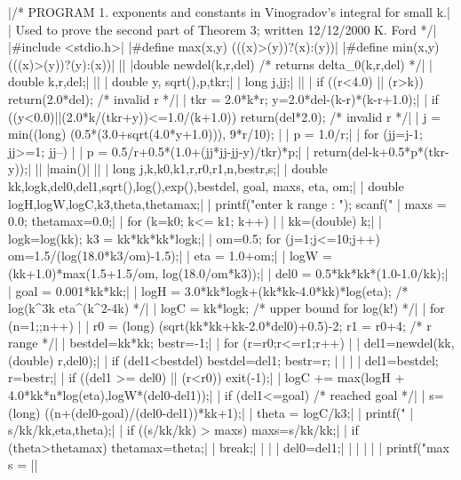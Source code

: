{

\eightpoint
\baselineskip 9pt
\beginlines
|/* PROGRAM 1. exponents and constants in Vinogradov's integral for small k.|
|   Used to prove the second part of Theorem 3; written 12/12/2000 K. Ford  */|
|#include <stdio.h>|
|#define max(x,y) (((x)>(y))?(x):(y))|
|#define min(x,y) (((x)>(y))?(y):(x))|
||
|double newdel(k,r,del)       /* returns delta_0(k,r,del) */|
|     double k,r,del;|
|{|
|  double y, sqrt(),p,tkr;|
|  long j,jj;|
||
|  if ((r<4.0) || (r>k)) return(2.0*del);  /* invalid r */|
|  tkr = 2.0*k*r; y=2.0*del-(k-r)*(k-r+1.0);|
|  if ((y<0.0)||(2.0*k/(tkr+y))<=1.0/(k+1.0)) return(del*2.0); /* invalid r */|
|  j = min((long) (0.5*(3.0+sqrt(4.0*y+1.0))), 9*r/10); |
|  p = 1.0/r;|
|  for (jj=j-1; jj>=1; jj--) |
|    p = 0.5/r+0.5*(1.0+(jj*jj-jj-y)/tkr)*p;|
|  return(del-k+0.5*p*(tkr-y));|
|}|
|main()|
|{|
|  long j,k,k0,k1,r,r0,r1,n,bestr,s;|
|  double kk,logk,del0,del1,sqrt(),log(),exp(),bestdel, goal, maxs, eta, om;|
|  double logH,logW,logC,k3,theta,thetamax;|
|  printf("enter k range : "); scanf("%
|  maxs = 0.0;  thetamax=0.0;|
|  for (k=k0; k<= k1; k++) {|
|    kk=(double) k;|
|    logk=log(kk); k3 = kk*kk*kk*logk;|
|    om=0.5; for (j=1;j<=10;j++) om=1.5/(log(18.0*k3/om)-1.5);|
|    eta = 1.0+om;|
|    logW = (kk+1.0)*max(1.5+1.5/om, log(18.0/om*k3));|
|    del0 = 0.5*kk*kk*(1.0-1.0/kk);|
|    goal = 0.001*kk*kk;|
|    logH = 3.0*kk*logk+(kk*kk-4.0*kk)*log(eta); /* log(k^3k eta^(k^2-4k) */|
|    logC = kk*logk;                           /* upper bound for log(k!) */|
|    for (n=1;;n++) {|
|      r0 = (long) (sqrt(kk*kk+kk-2.0*del0)+0.5)-2; r1 = r0+4; /* r range */|
|      bestdel=kk*kk; bestr=-1;|
|      for (r=r0;r<=r1;r++) {|
|        del1=newdel(kk,(double) r,del0);|
|        if (del1<bestdel) { bestdel=del1; bestr=r; }|
|      }|
|      del1=bestdel; r=bestr;|
|      if ((del1 >= del0) || (r<r0)) exit(-1);|
|      logC += max(logH + 4.0*kk*n*log(eta),logW*(del0-del1));|
|      if (del1<=goal) {                             /* reached goal */|
|        s=(long) ((n+(del0-goal)/(del0-del1))*kk+1);|
|        theta = logC/k3;|
|        printf("%
|            s/kk/kk,eta,theta);|
|        if ((s/kk/kk) > maxs) maxs=s/kk/kk;|
|        if (theta>thetamax) thetamax=theta;|
|        break;|
|      }|
|      del0=del1;|
|    }|
|  }|
|  printf("\n max s = %
|}|
\endlines

}
